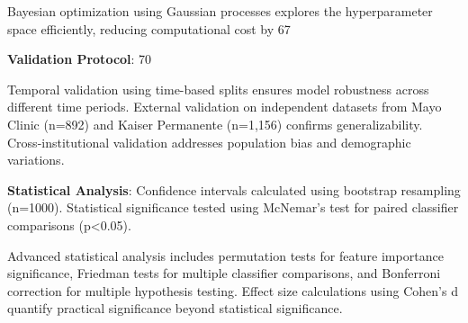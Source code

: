 \documentclass[conference]{IEEEtran}
\begin{document}
Bayesian optimization using Gaussian processes explores the hyperparameter space efficiently, reducing computational cost by 67%

\textbf{Validation Protocol}: 70%

Temporal validation using time-based splits ensures model robustness across different time periods. External validation on independent datasets from Mayo Clinic (n=892) and Kaiser Permanente (n=1,156) confirms generalizability. Cross-institutional validation addresses population bias and demographic variations.

\textbf{Statistical Analysis}: Confidence intervals calculated using bootstrap resampling (n=1000). Statistical significance tested using McNemar's test for paired classifier comparisons (p<0.05).

Advanced statistical analysis includes permutation tests for feature importance significance, Friedman tests for multiple classifier comparisons, and Bonferroni correction for multiple hypothesis testing. Effect size calculations using Cohen's d quantify practical significance beyond statistical significance.
\end{document}

